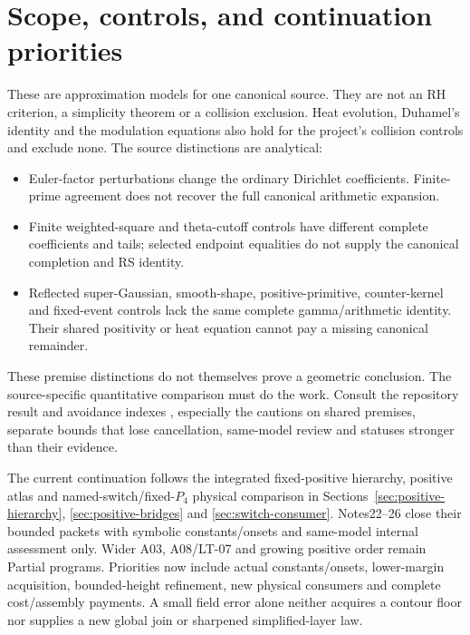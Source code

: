 \documentclass[11pt]{article}
\numberwithin{equation}{section}
\begin{document}
\section{Scope, controls, and continuation priorities}
These are approximation models for one canonical source. They are
not an RH criterion, a simplicity theorem or a collision exclusion.
Heat evolution, Duhamel's identity and the modulation equations also
hold for the project's collision controls and exclude none.
The source distinctions are analytical:
\begin{itemize}
\item Euler-factor perturbations change the ordinary Dirichlet
coefficients. Finite-prime agreement does not recover the full
canonical arithmetic expansion.
\item Finite weighted-square and theta-cutoff controls have different
complete coefficients and tails; selected endpoint equalities do not
supply the canonical completion and RS identity.
\item Reflected super-Gaussian, smooth-shape, positive-primitive,
counter-kernel and fixed-event controls lack the same complete
gamma/arithmetic identity. Their shared positivity or heat equation
cannot pay a missing canonical remainder.
\end{itemize}
These premise distinctions do not themselves prove a geometric
conclusion. The source-specific quantitative comparison must do the
work. Consult the repository result and avoidance indexes
\cite{controls,avoidance}, especially the cautions on shared premises,
separate bounds that lose cancellation, same-model review and statuses
stronger than their evidence.

The current continuation follows the integrated fixed-positive hierarchy,
positive atlas and named-switch/fixed-$P_4$ physical comparison in
Sections~\ref{sec:positive-hierarchy}, \ref{sec:positive-bridges} and
\ref{sec:switch-consumer}. Notes22--26 \cite{ansatz22,ansatz23,ansatz24,ansatz25,ansatz26}
close their bounded packets with symbolic constants/onsets and
same-model internal assessment only. Wider A03, A08/LT-07 and growing
positive order remain Partial programs. Priorities now include actual
constants/onsets, lower-margin acquisition, bounded-height refinement,
new physical consumers and complete cost/assembly payments. A small
field error alone neither acquires a contour floor nor supplies a new
global join or sharpened simplified-layer law.
\end{document}
